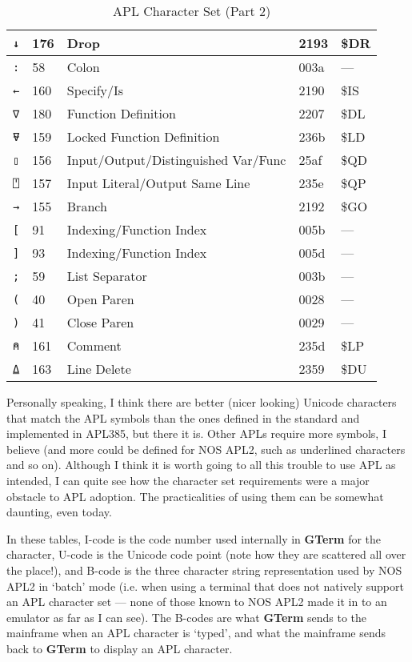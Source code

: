 \documentclass[a4paper,twoside,11pt]{article}
\newcommand{\newpara}{\par\vspace{4mm}\noindent}
\begin{document}
\begin{table}
\begin{tabular}{||l|l|l|l|l||}
\texttt{↓} & 176 & Drop & 2193 & \$DR\\\hline
\texttt{:} & 58 & Colon & 003a & ---\\\hline
\texttt{←} & 160 & Specify/Is & 2190 & \$IS\\\hline
\texttt{∇} & 180 & Function Definition & 2207 & \$DL\\\hline
\texttt{⍫} & 159 & Locked Function Definition & 236b & \$LD\\\hline
\texttt{▯} & 156 & Input/Output/Distinguished Var/Func & 25af & \$QD\\\hline
\texttt{⍞} & 157 & Input Literal/Output Same Line & 235e & \$QP\\\hline
\texttt{→} & 155 & Branch & 2192 & \$GO\\\hline
\texttt{{[}} & 91 & Indexing/Function Index & 005b & ---\\\hline
\texttt{{]}} & 93 & Indexing/Function Index & 005d & ---\\\hline
\texttt{;} & 59 & List Separator & 003b & ---\\\hline
\texttt{(} & 40 & Open Paren & 0028 & ---\\\hline
\texttt{)} & 41 & Close Paren & 0029 & ---\\\hline
\texttt{⍝} & 161 & Comment & 235d & \$LP\\\hline
\texttt{⍙} & 163 & Line Delete & 2359 & \$DU\\\hline
\hline\hline
\end{tabular}
\caption{APL Character Set (Part 2)}
\label{tab:aplcs2}
\end{table}

\newpara
Personally speaking, I think there are better (nicer looking) Unicode characters that match the APL symbols than the
ones defined in the standard and implemented in APL385, but there it is. Other APLs require more symbols, I
believe (and more could be defined for NOS APL2, such as underlined characters and so on). 
Although I think it is worth going to all this trouble to use APL as intended, 
I can quite
see how the character set requirements were 
a major obstacle to APL adoption.
The practicalities of using them can be somewhat daunting, even today.
\newpara
In these tables, I-code is the code number used internally in \textbf{GTerm} for the character,
U-code is the Unicode code point (note how they are scattered all over the place!),
and B-code is the three character string representation used by NOS APL2 in `batch'
mode (i.e. when using a terminal that does not natively support an APL character set ---
none of those known to NOS APL2 made it in to an emulator as far as I can see). The
B-codes are what \textbf{GTerm} sends to the mainframe when an APL character is `typed', and what the
mainframe sends back to \textbf{GTerm} to display an APL character.
\end{document}
